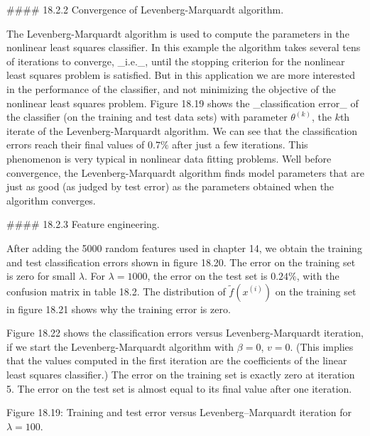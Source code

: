 

#### 18.2.2 Convergence of Levenberg-Marquardt algorithm.

The Levenberg-Marquardt algorithm is used to compute the parameters in the nonlinear least squares classifier. In this example the algorithm takes several tens of iterations to converge, _i.e._, until the stopping criterion for the nonlinear least squares problem is satisfied. But in this application we are more interested in the performance of the classifier, and not minimizing the objective of the nonlinear least squares problem. Figure 18.19 shows the _classification error_ of the classifier (on the training and test data sets) with parameter \(\theta^{(k)}\), the \(k\)th iterate of the Levenberg-Marquardt algorithm. We can see that the classification errors reach their final values of \(0.7\%\) after just a few iterations. This phenomenon is very typical in nonlinear data fitting problems. Well before convergence, the Levenberg-Marquardt algorithm finds model parameters that are just as good (as judged by test error) as the parameters obtained when the algorithm converges.

#### 18.2.3 Feature engineering.

After adding the 5000 random features used in chapter 14, we obtain the training and test classification errors shown in figure 18.20. The error on the training set is zero for small \(\lambda\). For \(\lambda=1000\), the error on the test set is \(0.24\%\), with the confusion matrix in table 18.2. The distribution of \(\tilde{f}(x^{(i)})\) on the training set in figure 18.21 shows why the training error is zero.

Figure 18.22 shows the classification errors versus Levenberg-Marquardt iteration, if we start the Levenberg-Marquardt algorithm with \(\beta=0\), \(v=0\). (This implies that the values computed in the first iteration are the coefficients of the linear least squares classifier.) The error on the training set is exactly zero at iteration 5. The error on the test set is almost equal to its final value after one iteration.

Figure 18.19: Training and test error versus Levenberg–Marquardt iteration for \(\lambda=100\).

